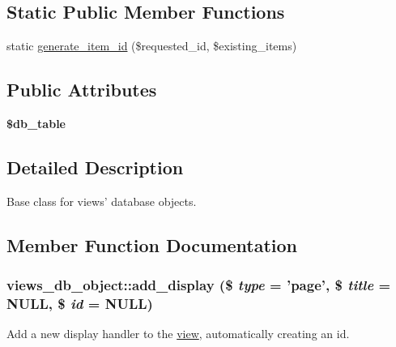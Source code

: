 \subsection*{Static Public Member Functions}
\begin{DoxyCompactItemize}
\item 
static \hyperlink{classviews__db__object_a0826c7652b5ef3e3cc9feec98e4fa445}{generate\_\-item\_\-id} (\$requested\_\-id, \$existing\_\-items)
\end{DoxyCompactItemize}
\subsection*{Public Attributes}
\begin{DoxyCompactItemize}
\item 
\hypertarget{classviews__db__object_a9e797d94f9991f1294b962c70af351ae}{
{\bfseries \$db\_\-table}}
\label{classviews__db__object_a9e797d94f9991f1294b962c70af351ae}

\end{DoxyCompactItemize}


\subsection{Detailed Description}
Base class for views' database objects. 

\subsection{Member Function Documentation}
\hypertarget{classviews__db__object_a6e9c2b7bb3d5670fefde14518a38de95}{
\subsubsection[{add\_\-display}]{\setlength{\rightskip}{0pt plus 5cm}views\_\-db\_\-object::add\_\-display (\$ {\em type} = {\ttfamily 'page'}, \/  \$ {\em title} = {\ttfamily NULL}, \/  \$ {\em id} = {\ttfamily NULL})}}
\label{classviews__db__object_a6e9c2b7bb3d5670fefde14518a38de95}
Add a new display handler to the \hyperlink{classview}{view}, automatically creating an id.


